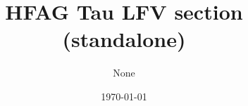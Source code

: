 \documentclass[11pt,twoside,a4paper]{article}
\begin{document}
\thispagestyle{empty}

\title{HFAG Tau LFV section (standalone)}
\author{None}
\date{\today}
\maketitle

\tableofcontents

\let\citeOld\cite
\renewcommand{\cite}[1]{\ifmmode\text{\citeOld{#1}}\else\citeOld{#1}\fi}

\newenvironment{ensuredisplaymath}
  {\(\displaystyle}
  {\)}

\makeatletter
\DeclareRobustCommand\bfseries{%
  \not@math@alphabet\bfseries\mathbf
  \fontseries\bfdefault\selectfont\boldmath}
\DeclareRobustCommand*{\bm}[1]{%
    \mathchoice{\bmbox{\displaystyle}{#1}}%
               {\bmbox{\textstyle}{#1}}%
               {\bmbox{\scriptstyle}{#1}}%
               {\bmbox{\scriptscriptstyle}{#1}}}
\DeclareRobustCommand*{\bmbox}[2]{\mbox{\bfseries$#1 #2$}}
\makeatother

\makeatletter
\def\LT@makecaption#1#2#3{%
  \LT@mcol\LT@cols c{\hbox to\z@{\hss\parbox[t]\LTcapwidth{%
    \sbox\@tempboxa{\normalsize#1{#2: }#3}%
    \ifdim\wd\@tempboxa>\hsize
      \normalsize#1{#2: }#3%
    \else
      \hbox to\hsize{\hfil\box\@tempboxa\hfil}%
    \fi
    \endgraf\vskip\baselineskip}%
  \hss}}}
\makeatother

\makeatletter

\newcommand{\htdef}[2]{%
  \@namedef{hfagtau@#1}{#2}%
}

\newcommand{\htuse}[1]{%
  \ifcsname hfagtau@#1\endcsname
  \@nameuse{hfagtau@#1}%
  \else
  \@latex@error{Undefined name hfagtau@#1}\@eha
  \fi}

\makeatother








\begin{small}

\end{small}
\end{document}
